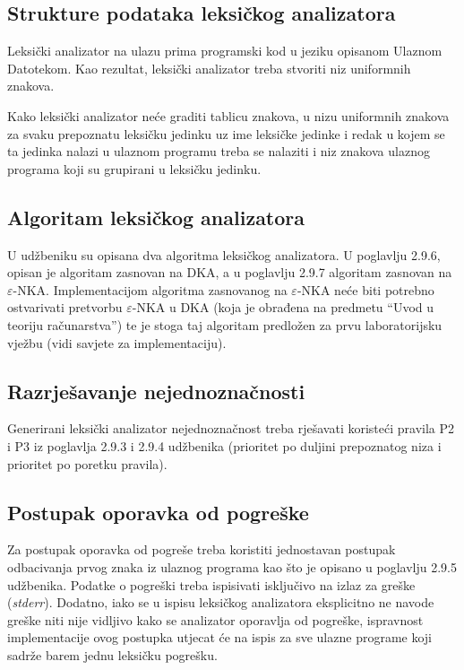 \documentclass[times, 12pt, utf8]{book}
\begin{document}
\subsection{Strukture podataka leksičkog analizatora}
Leksički analizator na ulazu prima programski kod u jeziku opisanom Ulaznom Datotekom.
Kao rezultat, leksički analizator treba stvoriti niz uniformnih znakova.

Kako leksički analizator neće graditi tablicu znakova, u nizu uniformnih znakova za svaku prepoznatu leksičku jedinku uz ime leksičke jedinke i redak u kojem se ta jedinka nalazi u ulaznom programu treba se nalaziti i niz znakova ulaznog programa koji su grupirani u leksičku jedinku.

\subsection{Algoritam leksičkog analizatora}
U udžbeniku su opisana dva algoritma leksičkog analizatora.
U poglavlju 2.9.6, opisan je algoritam zasnovan na DKA, a u poglavlju 2.9.7 algoritam zasnovan na \(\varepsilon\)-NKA.
Implementacijom algoritma zasnovanog na \(\varepsilon\)-NKA neće biti potrebno ostvarivati pretvorbu \(\varepsilon\)-NKA u DKA (koja je obrađena na predmetu “Uvod u teoriju računarstva”) te je stoga taj algoritam predložen za prvu laboratorijsku vježbu (vidi savjete za implementaciju).

\subsection{Razrješavanje nejednoznačnosti}
Generirani leksički analizator nejednoznačnost treba rješavati koristeći pravila P2 i P3 iz poglavlja 2.9.3 i 2.9.4 udžbenika (prioritet po duljini prepoznatog niza i prioritet po poretku pravila).

\subsection{Postupak oporavka od pogreške}
Za postupak oporavka od pogreše treba koristiti jednostavan postupak odbacivanja prvog znaka iz ulaznog programa kao što je opisano u poglavlju 2.9.5 udžbenika.
Podatke o pogreški treba ispisivati isključivo na izlaz za greške (\emph{stderr}).
Dodatno, iako se u ispisu leksičkog analizatora eksplicitno ne navode greške niti nije vidljivo kako se analizator oporavlja od pogreške, ispravnost implementacije ovog postupka utjecat će na ispis za sve ulazne programe koji sadrže barem jednu leksičku pogrešku.
\end{document}
